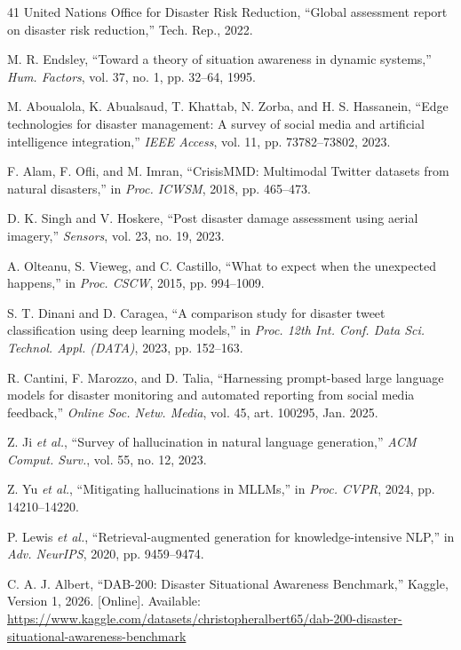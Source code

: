 \documentclass[conference]{IEEEtran}
\begin{document}
\def\IEEEbibitemsep{-1.2pt plus 0.4pt}
\begin{thebibliography}{41}
 United Nations Office for Disaster Risk Reduction, ``Global assessment report on disaster risk reduction,'' Tech. Rep., 2022.

 M. R. Endsley, ``Toward a theory of situation awareness in dynamic systems,'' \textit{Hum. Factors}, vol. 37, no. 1, pp. 32--64, 1995.

 M. Aboualola, K. Abualsaud, T. Khattab, N. Zorba, and H. S. Hassanein, ``Edge technologies for disaster management: A survey of social media and artificial intelligence integration,'' \textit{IEEE Access}, vol. 11, pp. 73782--73802, 2023.

 F. Alam, F. Ofli, and M. Imran, ``CrisisMMD: Multimodal Twitter datasets from natural disasters,'' in \textit{Proc. ICWSM}, 2018, pp. 465--473.

 D. K. Singh and V. Hoskere, ``Post disaster damage assessment using aerial imagery,'' \textit{Sensors}, vol. 23, no. 19, 2023.

 A. Olteanu, S. Vieweg, and C. Castillo, ``What to expect when the unexpected happens,'' in \textit{Proc. CSCW}, 2015, pp. 994--1009.

 S. T. Dinani and D. Caragea, ``A comparison study for disaster tweet classification using deep learning models,'' in \textit{Proc. 12th Int. Conf. Data Sci. Technol. Appl. (DATA)}, 2023, pp. 152--163.

 R. Cantini, F. Marozzo, and D. Talia, ``Harnessing prompt-based large language models for disaster monitoring and automated reporting from social media feedback,'' \textit{Online Soc. Netw. Media}, vol. 45, art. 100295, Jan. 2025.

 Z. Ji \textit{et al.}, ``Survey of hallucination in natural language generation,'' \textit{ACM Comput. Surv.}, vol. 55, no. 12, 2023.

 Z. Yu \textit{et al.}, ``Mitigating hallucinations in MLLMs,'' in \textit{Proc. CVPR}, 2024, pp. 14210--14220.

 P. Lewis \textit{et al.}, ``Retrieval-augmented generation for knowledge-intensive NLP,'' in \textit{Adv. NeurIPS}, 2020, pp. 9459--9474.

C. A. J. Albert,
``DAB-200: Disaster Situational Awareness Benchmark,''
Kaggle, Version 1, 2026. [Online]. Available:
\url{https://www.kaggle.com/datasets/christopheralbert65/dab-200-disaster-situational-awareness-benchmark}


\end{thebibliography}
\end{document}
